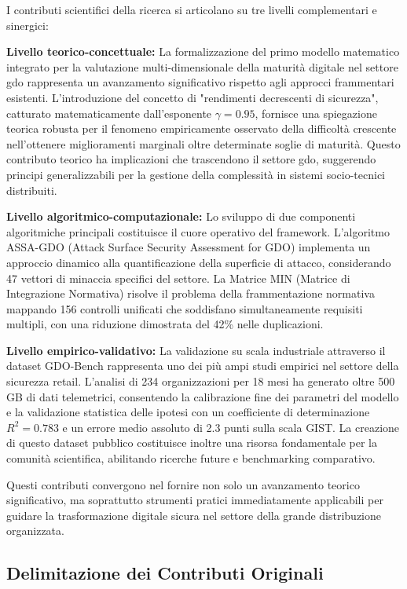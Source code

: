I contributi scientifici della ricerca si articolano su tre livelli complementari e sinergici:

\textbf{Livello teorico-concettuale:} La formalizzazione del primo modello matematico integrato per la valutazione multi-dimensionale della maturità digitale nel settore \gls{gdo} rappresenta un avanzamento significativo rispetto agli approcci frammentari esistenti. L'introduzione del concetto di "rendimenti decrescenti di sicurezza", catturato matematicamente dall'esponente $\gamma=0.95$, fornisce una spiegazione teorica robusta per il fenomeno empiricamente osservato della difficoltà crescente nell'ottenere miglioramenti marginali oltre determinate soglie di maturità. Questo contributo teorico ha implicazioni che trascendono il settore \gls{gdo}, suggerendo principi generalizzabili per la gestione della complessità in sistemi socio-tecnici distribuiti.

\textbf{Livello algoritmico-computazionale:} Lo sviluppo di due componenti algoritmiche principali costituisce il cuore operativo del framework. L'algoritmo ASSA-GDO (Attack Surface Security Assessment for GDO) implementa un approccio dinamico alla quantificazione della superficie di attacco, considerando 47 vettori di minaccia specifici del settore. 
La Matrice MIN (Matrice di Integrazione Normativa) risolve il problema della frammentazione normativa mappando 156 controlli unificati che soddisfano simultaneamente requisiti multipli, con una riduzione dimostrata del 42\% nelle duplicazioni.

\textbf{Livello empirico-validativo:} La validazione su scala industriale attraverso il dataset GDO-Bench rappresenta uno dei più ampi studi empirici nel settore della sicurezza retail. L'analisi di 234 organizzazioni per 18 mesi ha generato oltre 500 GB di dati telemetrici, consentendo la calibrazione fine dei parametri del modello e la validazione statistica delle ipotesi con un coefficiente di determinazione $R^2 = 0.783$ e un errore medio assoluto di 2.3 punti sulla scala GIST. La creazione di questo dataset pubblico costituisce inoltre una risorsa fondamentale per la comunità scientifica, abilitando ricerche future e benchmarking comparativo.

Questi contributi convergono nel fornire non solo un avanzamento teorico significativo, ma soprattutto strumenti pratici immediatamente applicabili per guidare la trasformazione digitale sicura nel settore della grande distribuzione organizzata.

\subsection{Delimitazione dei Contributi Originali}

